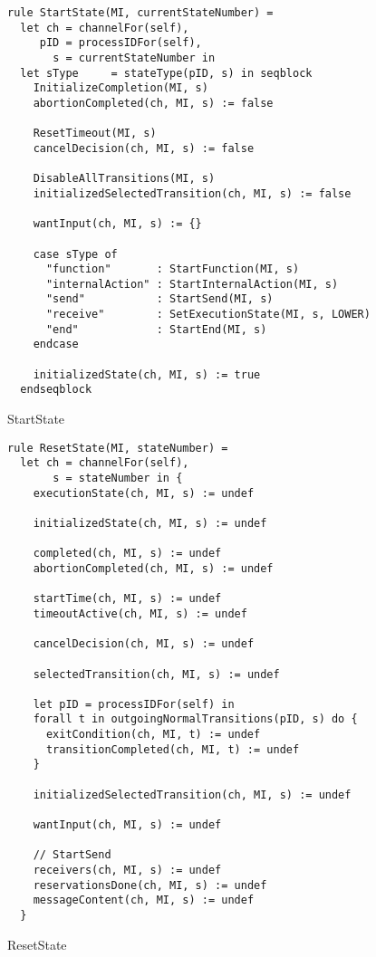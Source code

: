 \begin{listing}[H]
\begin{verbatim}
rule StartState(MI, currentStateNumber) =
  let ch = channelFor(self),
     pID = processIDFor(self),
       s = currentStateNumber in
  let sType     = stateType(pID, s) in seqblock
    InitializeCompletion(MI, s)
    abortionCompleted(ch, MI, s) := false

    ResetTimeout(MI, s)
    cancelDecision(ch, MI, s) := false

    DisableAllTransitions(MI, s)
    initializedSelectedTransition(ch, MI, s) := false

    wantInput(ch, MI, s) := {}

    case sType of
      "function"       : StartFunction(MI, s)
      "internalAction" : StartInternalAction(MI, s)
      "send"           : StartSend(MI, s)
      "receive"        : SetExecutionState(MI, s, LOWER)
      "end"            : StartEnd(MI, s)
    endcase

    initializedState(ch, MI, s) := true
  endseqblock
\end{verbatim}
\caption{StartState}
\label{lst:asm:StartState}
\end{listing}




\begin{listing}[H]
\begin{verbatim}
rule ResetState(MI, stateNumber) =
  let ch = channelFor(self),
       s = stateNumber in {
    executionState(ch, MI, s) := undef

    initializedState(ch, MI, s) := undef

    completed(ch, MI, s) := undef
    abortionCompleted(ch, MI, s) := undef

    startTime(ch, MI, s) := undef
    timeoutActive(ch, MI, s) := undef

    cancelDecision(ch, MI, s) := undef

    selectedTransition(ch, MI, s) := undef

    let pID = processIDFor(self) in
    forall t in outgoingNormalTransitions(pID, s) do {
      exitCondition(ch, MI, t) := undef
      transitionCompleted(ch, MI, t) := undef
    }

    initializedSelectedTransition(ch, MI, s) := undef

    wantInput(ch, MI, s) := undef

    // StartSend
    receivers(ch, MI, s) := undef
    reservationsDone(ch, MI, s) := undef
    messageContent(ch, MI, s) := undef
  }
\end{verbatim}
\caption{ResetState}
\label{lst:asm:ResetState}
\end{listing}




